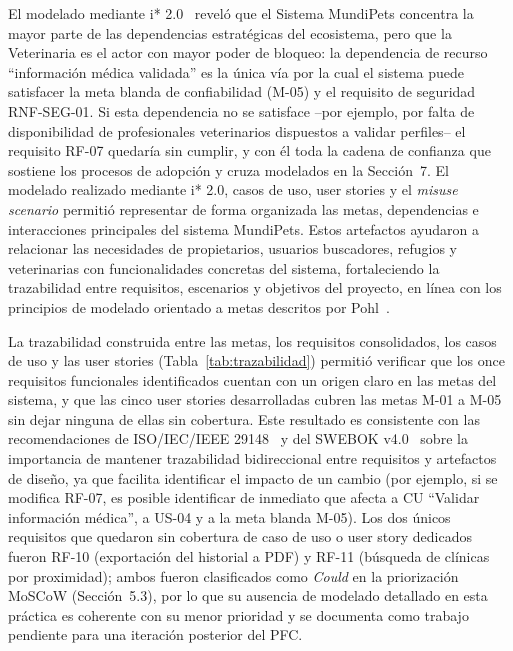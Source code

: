 \documentclass[journal,onecolumn]{IEEEtran}
\begin{document}
El modelado mediante i* 2.0~\cite{yu2011} reveló que el Sistema MundiPets
concentra la mayor parte de las dependencias estratégicas del ecosistema,
pero que la Veterinaria es el actor con mayor poder de bloqueo: la
dependencia de recurso ``información médica validada'' es la única vía por
la cual el sistema puede satisfacer la meta blanda de confiabilidad (M-05)
y el requisito de seguridad RNF-SEG-01. Si esta dependencia no se
satisface --por ejemplo, por falta de disponibilidad de profesionales
veterinarios dispuestos a validar perfiles-- el requisito RF-07 quedaría
sin cumplir, y con él toda la cadena de confianza que sostiene los procesos
de adopción y cruza modelados en la Sección~7. El modelado realizado
mediante i* 2.0, casos de uso, user stories y el \textit{misuse scenario}
permitió representar de forma organizada las metas, dependencias e
interacciones principales del sistema MundiPets. Estos artefactos ayudaron
a relacionar las necesidades de propietarios, usuarios buscadores, refugios
y veterinarias con funcionalidades concretas del sistema, fortaleciendo la
trazabilidad entre requisitos, escenarios y objetivos del proyecto, en
línea con los principios de modelado orientado a metas descritos por
Pohl~\cite{pohl2025}.

La trazabilidad construida entre las metas, los requisitos consolidados,
los casos de uso y las user stories (Tabla~\ref{tab:trazabilidad}) permitió
verificar que los once requisitos funcionales identificados cuentan con un
origen claro en las metas del sistema, y que las cinco user stories
desarrolladas cubren las metas M-01 a M-05 sin dejar ninguna de ellas sin
cobertura. Este resultado es consistente con las recomendaciones de
ISO/IEC/IEEE 29148~\cite{iso29148} y del SWEBOK v4.0~\cite{swebok2024} sobre
la importancia de mantener trazabilidad bidireccional entre requisitos y
artefactos de diseño, ya que facilita identificar el impacto de un cambio
(por ejemplo, si se modifica RF-07, es posible identificar de inmediato que
afecta a CU ``Validar información médica'', a US-04 y a la meta blanda
M-05). Los dos únicos requisitos que quedaron sin cobertura de caso de uso o
user story dedicados fueron RF-10 (exportación del historial a PDF) y RF-11
(búsqueda de clínicas por proximidad); ambos fueron clasificados como
\textit{Could} en la priorización MoSCoW (Sección~5.3), por lo que su
ausencia de modelado detallado en esta práctica es coherente con su menor
prioridad y se documenta como trabajo pendiente para una iteración
posterior del PFC.
\end{document}
